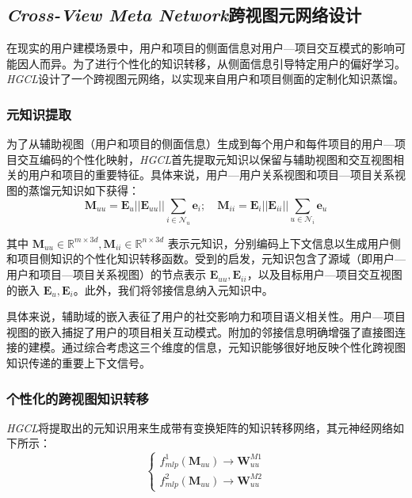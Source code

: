 \documentclass{article}
\begin{document}
\subsection{\emph{Cross-View Meta Network}跨视图元网络设计}

在现实的用户建模场景中，用户和项目的侧面信息对用户—项目交互模式的影响可能因人而异。为了进行个性化的知识转移，从侧面信息引导特定用户的偏好学习。\emph{HGCL}设计了一个跨视图元网络，以实现来自用户和项目侧面的定制化知识蒸馏。

\subsubsection{元知识提取}

为了从辅助视图（用户和项目的侧面信息）生成到每个用户和每件项目的用户—项目交互编码的个性化映射，\emph{HGCL}首先提取元知识以保留与辅助视图和交互视图相关的用户和项目的重要特征。具体来说，用户—用户关系视图和项目—项目关系视图的蒸馏元知识如下获得：
\begin{equation}
\mathbf{M}_{uu}=\mathbf{E}_u||\mathbf{E}_{uu}||\sum_{i\in\mathcal{N}_u}\mathbf{e}_i;\quad\mathbf{M}_{ii}=\mathbf{E}_i||\mathbf{E}_{ii}||\sum_{u\in\mathcal{N}_i}\mathbf{e}_u
\end{equation}

其中 \( \mathbf{M}_{uu} \in \mathbb{R}^{m \times 3d}, \mathbf{M}_{ii} \in \mathbb{R}^{n \times 3d} \) 表示元知识，分别编码上下文信息以生成用户侧和项目侧知识的个性化知识转移函数。受到\cite{Xia_2021}的启发，元知识包含了源域（即用户—用户和项目—项目关系视图）的节点表示 \( \mathbf{E}_{uu}, \mathbf{E}_{ii} \)，以及目标用户—项目交互视图的嵌入 \( \mathbf{E}_u, \mathbf{E}_i \)。此外，我们将邻接信息纳入元知识中。

具体来说，辅助域的嵌入表征了用户的社交影响力和项目语义相关性。用户—项目视图的嵌入捕捉了用户的项目相关互动模式。附加的邻接信息明确增强了直接图连接的建模。通过综合考虑这三个维度的信息，元知识能够很好地反映个性化跨视图知识传递的重要上下文信号。

\subsubsection{个性化的跨视图知识转移}

\emph{HGCL}将提取出的元知识用来生成带有变换矩阵的知识转移网络，其元神经网络如下所示：
\begin{equation}
\begin{cases}f_{mlp}^1(\mathbf{M}_{uu})\to\mathbf{W}_{uu}^{M1}\\f_{mlp}^2(\mathbf{M}_{uu})\to\mathbf{W}_{uu}^{M2}\end{cases}
\end{equation}
\end{document}

